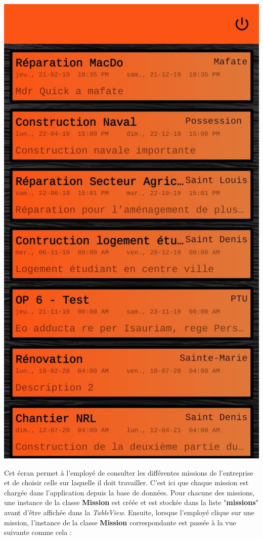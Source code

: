 \documentclass{article}
\begin{document}
\begin{center}
  \includegraphics[scale=0.15]{missionsAnd.jpg}
\end{center}

Cet écran permet à l'employé de consulter les différentes missions de l'entreprise et de choisir celle sur laquelle il doit travailler.
C'est ici que chaque mission est chargée dans l'application depuis la base de données. Pour chacune des missions, une instance de la classe \textbf{Mission}  est créée et est stockée dans la liste "\textbf{missions}" avant d'être affichée dans la \textit{TableView}.
Ensuite, lorsque l'employé clique sur une mission, l'instance de la classe \textbf{Mission} correspondante est passée à la vue suivante comme cela : 
\end{document}
